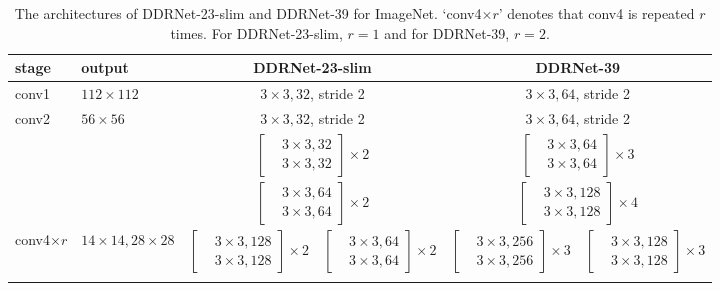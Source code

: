 \documentclass[journal]{IEEEtran}
\begin{document}
\begin{table*}[]
\caption{The architectures of DDRNet-23-slim and DDRNet-39 for ImageNet. `conv4$\times r$' denotes that conv4 is repeated $r$ times. For DDRNet-23-slim, $r = 1$ and for DDRNet-39, $r = 2$.}
\label{tab:3}
\begin{tabular}{p{40pt}<{\centering}|p{60pt}<{\centering}|p{85pt}<{\centering}|p{85pt}<{\centering}|p{85pt}<{\centering}|p{85pt}<{\centering}}
\toprule
stage           &output  & \multicolumn{2}{c|}{DDRNet-23-slim}& \multicolumn{2}{c}{DDRNet-39}      \\ \hline
conv1           &$112\times112$&\multicolumn{2}{c|}{$3\times3, 32$, stride 2}& \multicolumn{2}{c}{$3\times3, 64$, stride 2}         \\ \hline
\multirow{3}{*}{conv2}&\multirow{3}{*}{$56\times56$} & \multicolumn{2}{c|}{$3\times3, 32$, stride 2}& \multicolumn{2}{c}{$3\times3, 64$, stride 2}         \\ \cline{3-6}
                    &   & \multicolumn{2}{c|}{$\left[\begin{aligned}&3 \times 3, 32\\&3 \times 3, 32\end{aligned}\right] \times 2$}
                        & \multicolumn{2}{c}{$\left[\begin{aligned}&3 \times 3, 64\\&3 \times 3, 64\end{aligned}\right] \times 3$}\\ \hline
conv3           &$28\times28$       & \multicolumn{2}{c|}{$\left[\begin{aligned}&3 \times 3, 64\\&3 \times 3, 64\end{aligned}\right] \times 2$}& \multicolumn{2}{c}{$\left[\begin{aligned}&3 \times 3, 128\\&3 \times 3, 128\end{aligned}\right] \times 4$}\\\hline
\multirow{2}{*}{conv4$\times r$} & \multirow{2}{*}{$14\times14, 28\times28$}& $\left[\begin{aligned}&3 \times 3, 128\\&3 \times 3, 128\end{aligned}\right] \times 2$                  &$\left[\begin{aligned}&3 \times 3, 64\\&3 \times 3, 64\end{aligned}\right] \times 2$ & $\left[\begin{aligned}&3 \times 3, 256\\&3 \times 3, 256\end{aligned}\right] \times 3$                  &$\left[\begin{aligned}&3 \times 3, 128\\&3 \times 3, 128\end{aligned}\right] \times 3$                  \\ \cline{3-6}

\end{tabular}
\end{table*}
\end{document}
